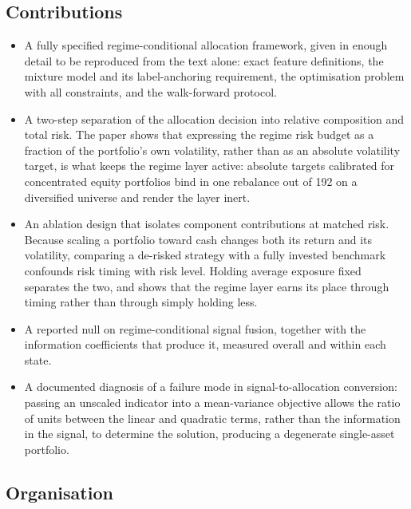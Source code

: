 \documentclass{singlecol-new}
\theoremstyle{TH}{
\newtheorem{lemma}{Lemma}
\newtheorem{theorem}[lemma]{Theorem}
\newtheorem{corrolary}[lemma]{Corrolary}
\newtheorem{conjecture}[lemma]{Conjecture}
\newtheorem{proposition}[lemma]{Proposition}
\newtheorem{claim}[lemma]{Claim}
\newtheorem{stheorem}[lemma]{Wrong Theorem}
\newtheorem{algorithm}{Algorithm}
}
\theoremstyle{THrm}{
\newtheorem{definition}{Definition}[section]
\newtheorem{question}{Question}[section]
\newtheorem{remark}{Remark}
\newtheorem{scheme}{Scheme}
}
\theoremstyle{THhit}{
\newtheorem{case}{Case}[section]
}
\begin{document}
\subsection{Contributions}

\begin{itemize}

\item A fully specified regime-conditional allocation framework, given in enough detail
to be reproduced from the text alone: exact feature definitions, the mixture model and
its label-anchoring requirement, the optimisation problem with all constraints, and the
walk-forward protocol.

\item A two-step separation of the allocation decision into relative composition and
total risk. The paper shows that expressing the regime risk budget as a fraction of the
portfolio's own volatility, rather than as an absolute volatility target, is what keeps
the regime layer active: absolute targets calibrated for concentrated equity portfolios
bind in one rebalance out of 192 on a diversified universe and render the layer inert.

\item An ablation design that isolates component contributions at matched risk. Because
scaling a portfolio toward cash changes both its return and its volatility, comparing a
de-risked strategy with a fully invested benchmark confounds risk timing with risk
level. Holding average exposure fixed separates the two, and shows that the regime
layer earns its place through timing rather than through simply holding less.

\item A reported null on regime-conditional signal fusion, together with the
information coefficients that produce it, measured overall and within each state.

\item A documented diagnosis of a failure mode in signal-to-allocation conversion:
passing an unscaled indicator into a mean-variance objective allows the ratio of units
between the linear and quadratic terms, rather than the information in the signal, to
determine the solution, producing a degenerate single-asset portfolio.

\end{itemize}

\subsection{Organisation}
\end{document}
